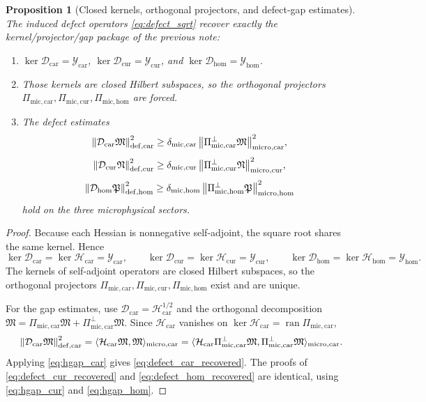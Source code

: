 \documentclass[11pt]{article}
\newcommand{\ProtoTensorClass}{\mathscr Y_{\mathrm{car}}}
\newcommand{\ProtoRelabelClass}{\mathscr Y_{\mathrm{cur}}}
\newcommand{\ProtoFreeClass}{\mathscr Y_{\mathrm{hom}}}
\newcommand{\UltraTensor}{\mathfrak M}
\newcommand{\UltraRelabel}{\mathfrak N}
\newcommand{\UltraFree}{\mathfrak P}
\newcommand{\UltraCarProj}{\Pi_{\mathrm{mic,car}}}
\newcommand{\UltraCurProj}{\Pi_{\mathrm{mic,cur}}}
\newcommand{\UltraHomProj}{\Pi_{\mathrm{mic,hom}}}
\newcommand{\UltraCarPerp}{\Pi_{\mathrm{mic,car}}^{\perp}}
\newcommand{\UltraCurPerp}{\Pi_{\mathrm{mic,cur}}^{\perp}}
\newcommand{\UltraHomPerp}{\Pi_{\mathrm{mic,hom}}^{\perp}}
\newcommand{\UltraCarGap}{\delta_{\mathrm{mic,car}}}
\newcommand{\UltraCurGap}{\delta_{\mathrm{mic,cur}}}
\newcommand{\UltraHomGap}{\delta_{\mathrm{mic,hom}}}
\newcommand{\TensorDefect}{\mathcal D_{\mathrm{car}}}
\newcommand{\CurDefect}{\mathcal D_{\mathrm{cur}}}
\newcommand{\HomDefect}{\mathcal D_{\mathrm{hom}}}
\newcommand{\TensorHess}{\mathcal H_{\mathrm{car}}}
\newcommand{\CurHess}{\mathcal H_{\mathrm{cur}}}
\newcommand{\HomHess}{\mathcal H_{\mathrm{hom}}}
\newtheorem{proposition}{Proposition}
\begin{document}
\begin{proposition}[Closed kernels, orthogonal projectors, and defect-gap estimates]
\label{prop:kernel_gap}
The induced defect operators \eqref{eq:defect_sqrt} recover exactly the kernel/projector/gap package of the previous note:
\begin{enumerate}
    \item \(\ker\TensorDefect=\ProtoTensorClass\), \(\ker\CurDefect=\ProtoRelabelClass\), and \(\ker\HomDefect=\ProtoFreeClass\).
    \item Those kernels are closed Hilbert subspaces, so the orthogonal projectors \(\UltraCarProj,\UltraCurProj,\UltraHomProj\) are forced.
    \item The defect estimates
    \begin{equation}
    \norm{\TensorDefect\UltraTensor}_{\mathrm{def,car}}^2
    \ge
    \UltraCarGap\,\norm{\UltraCarPerp\UltraTensor}_{\mathrm{micro,car}}^2,
    \label{eq:defect_car_recovered}
    \end{equation}
    \begin{equation}
    \norm{\CurDefect\UltraRelabel}_{\mathrm{def,cur}}^2
    \ge
    \UltraCurGap\,\norm{\UltraCurPerp\UltraRelabel}_{\mathrm{micro,cur}}^2,
    \label{eq:defect_cur_recovered}
    \end{equation}
    \begin{equation}
    \norm{\HomDefect\UltraFree}_{\mathrm{def,hom}}^2
    \ge
    \UltraHomGap\,\norm{\UltraHomPerp\UltraFree}_{\mathrm{micro,hom}}^2
    \label{eq:defect_hom_recovered}
    \end{equation}
    hold on the three microphysical sectors.
\end{enumerate}
\end{proposition}

\begin{proof}
Because each Hessian is nonnegative self-adjoint, the square root shares the same kernel. Hence
\[
\ker\TensorDefect=\ker\TensorHess=\ProtoTensorClass,
\qquad
\ker\CurDefect=\ker\CurHess=\ProtoRelabelClass,
\qquad
\ker\HomDefect=\ker\HomHess=\ProtoFreeClass.
\]
The kernels of self-adjoint operators are closed Hilbert subspaces, so the orthogonal projectors \(\UltraCarProj,\UltraCurProj,\UltraHomProj\) exist and are unique.

For the gap estimates, use \(\TensorDefect=\TensorHess^{1/2}\) and the orthogonal decomposition \(\UltraTensor=\UltraCarProj\UltraTensor+\UltraCarPerp\UltraTensor\). Since \(\TensorHess\) vanishes on \(\ker\TensorHess=\operatorname{ran}\UltraCarProj\),
\[
\norm{\TensorDefect\UltraTensor}_{\mathrm{def,car}}^2
=
\langle \TensorHess\UltraTensor,\UltraTensor\rangle_{\mathrm{micro,car}}
=
\langle \TensorHess\UltraCarPerp\UltraTensor,\UltraCarPerp\UltraTensor\rangle_{\mathrm{micro,car}}.
\]
Applying \eqref{eq:hgap_car} gives \eqref{eq:defect_car_recovered}. The proofs of \eqref{eq:defect_cur_recovered} and \eqref{eq:defect_hom_recovered} are identical, using \eqref{eq:hgap_cur} and \eqref{eq:hgap_hom}.
\end{proof}
\end{document}

